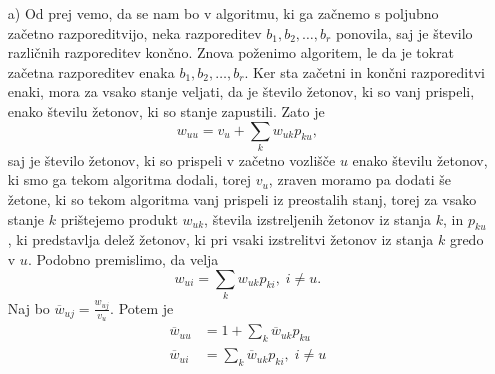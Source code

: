 \documentclass[twoside,11pt]{article}
\begin{document}
\begin{enumerate}
    \item[a)] Od prej vemo, da se nam bo v algoritmu, ki ga začnemo s poljubno začetno razporeditvijo, neka razporeditev $b_{1},b_{2},\ldots,b_{r}$ ponovila, saj je število različnih razporeditev končno. Znova poženimo algoritem, le da je tokrat začetna razporeditev enaka $b_{1},b_{2},\ldots,b_{r}$. Ker sta začetni in končni razporeditvi enaki, mora za vsako stanje veljati, da je število žetonov, ki so vanj prispeli, enako številu žetonov, ki so stanje zapustili. Zato je 
$$w_{uu} = v_{u} + \sum_{k} w_{uk}p_{ku},$$ saj je število žetonov, ki so prispeli v začetno vozlišče $u$ enako številu žetonov, ki smo ga tekom algoritma dodali, torej $v_{u}$, zraven moramo pa dodati še žetone, ki so tekom algoritma vanj prispeli iz preostalih stanj, torej za vsako stanje $k$ prištejemo produkt $w_{uk}$, števila izstreljenih žetonov iz stanja $k$, in $p_{ku}$, ki predstavlja delež žetonov, ki pri vsaki izstrelitvi žetonov iz stanja $k$ gredo v $u$. 
Podobno premislimo, da velja
$$w_{ui} = \sum_{k} w_{uk}p_{ki}, \;i\neq u.$$
Naj bo $\overline{w}_{uj} = \frac{w_{uj}}{v_{u}}$. Potem je 
\[
    \begin{split}
        \overline{w}_{uu} &= 1 + \sum_{k} \overline{w}_{uk}p_{ku} \\
        \overline{w}_{ui} &= \sum_{k} \overline{w}_{uk}p_{ki}, \; i \neq u
    \end{split}
\]


\end{enumerate}
\end{document}
